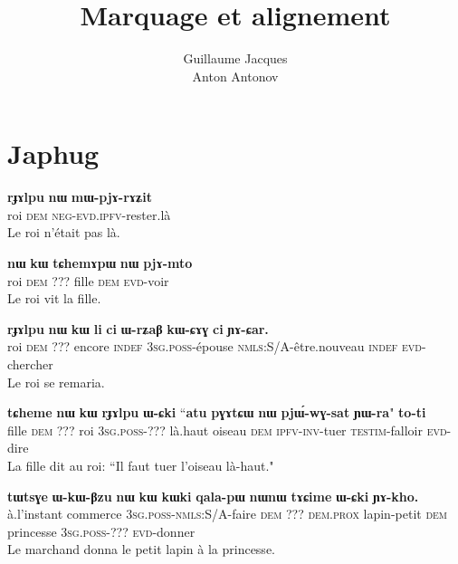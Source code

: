 \documentclass[oldfontcommands,twoside,a4paper,12pt]{article}
\newcommand{\ipa}[1]{{\phon\textbf{#1}}}
\begin{document}
\title{Marquage et alignement}
\author{Guillaume Jacques\\Anton Antonov}
\maketitle

\section{Japhug}
 \begin{exe}
\ex
\gll
\ipa{rɟɤlpu}  	\ipa{nɯ}  	\ipa{mɯ-pjɤ-rɤʑit}  \\
roi \textsc{dem} \textsc{neg-evd.ipfv}-rester.là \\
 \glt Le roi n'était pas là.
\end{exe}

 \begin{exe}
\ex 
\gll \ipa{rɟɤlpu}  	\ipa{nɯ}  	\ipa{kɯ}  	\ipa{tɕhemɤpɯ}  	\ipa{nɯ}  	\ipa{pjɤ-mto}   \\
roi \textsc{dem} ??? fille \textsc{dem} \textsc{evd}-voir \\
\glt Le roi vit la fille.
\end{exe}

 \begin{exe}
\ex 
\gll 
\ipa{rɟɤlpu}  	\ipa{nɯ}  	\ipa{kɯ}  	\ipa{li}  	\ipa{ci}  	\ipa{ɯ-rʑaβ}  	\ipa{kɯ-ɕɤɣ}  	\ipa{ci}  	\ipa{ɲɤ-ɕar.}  	 \\
roi \textsc{dem} ??? encore \textsc{indef} \textsc{3sg.poss}-épouse \textsc{nmls}:S/A-être.nouveau \textsc{indef}  \textsc{evd}-chercher \\
\glt Le roi se remaria.
\end{exe}

 \begin{exe}
\ex 
\gll 
\ipa{tɕheme}  	\ipa{nɯ}  	\ipa{kɯ}  	\ipa{rɟɤlpu}  	\ipa{ɯ-ɕki}  	``\ipa{atu}  	\ipa{pɣɤtɕɯ}  	\ipa{nɯ}  	\ipa{pjɯ́-wɣ-sat}  	\ipa{ɲɯ-ra}"  	\ipa{to-ti}  	\\
fille \textsc{dem} ??? roi \textsc{3sg.poss}-??? là.haut oiseau \textsc{dem} \textsc{ipfv-inv}-tuer \textsc{testim}-falloir \textsc{evd}-dire \\
\glt La fille dit au roi: ``Il faut tuer l'oiseau là-haut."
\end{exe}


 \begin{exe}
\ex 
\gll \ipa{iɕqha}  	\ipa{tɯtsɣe}  	\ipa{ɯ-kɯ-βzu}  	\ipa{nɯ}  	\ipa{kɯ}  	\ipa{kɯki}  	\ipa{qala-pɯ}  	\ipa{nɯnɯ}  	\ipa{tɤɕime}  	\ipa{ɯ-ɕki}  	\ipa{ɲɤ-kho.}  	\\
à.l'instant commerce \textsc{3sg.poss-nmls}:S/A-faire \textsc{dem} ??? \textsc{dem.prox} lapin-petit \textsc{dem} princesse \textsc{3sg.poss}-??? \textsc{evd}-donner \\
\glt Le marchand donna le petit lapin à la princesse.
\end{exe}
\end{document}
